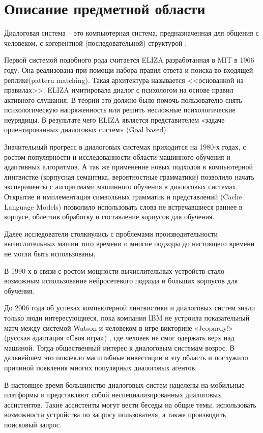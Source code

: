 \chapter{Описание предметной области}
Диалоговая система – это компьютерная система, предназначенная для общения с человеком, с когерентной (последовательной) структурой \cite{jurafsky2017dialog}.

Первой системой подобного рода считается ELIZA разработанная в MIT в 1966 году. Она реализована при помощи набора правил ответа и поиска во входящей реплике(pattern matching). Такая архитектура называется  <<основанной на правилах>>. ELIZA имитировала диалог с психологом на основе правил активного слушания. В теории это должно было помочь пользователю снять психологическую напряженность или решить несложные психологические неурядицы.  В результате чего ELIZA является представителем «задаче ориентированных диалоговых систем» (Goal based). 

Значительный прогресс в диалоговых системах приходится на 1980-х годах, с ростом популярности и исследованности области машинного обучения и адаптивных алгоритмов. А так же применение новых подходов в компьютерной лингвистке (корпусная семантика, вероятностные грамматики)  позволило начать эксперименты с  алгоритмами машинного обучения в диалоговых системах. Открытие и имплементация символьных грамматик и представлений (Cache Language Models) \cite{li2018recurrent} позволило использовать слова не встречавшиеся раннее в корпусе, облегчив обработку и составление корпусов для обучения. 

Далее исследователи столкнулись с проблемами производительности вычислительных машин того времени и многие подходы до настоящего времени не могли быть использованы. 

В 1990-х в связи с ростом мощности вычислительных устройств стало возможным использование нейросетевого подхода и больших корпусов для обучения. 

До 2006 года об успехах компьютерной лингвистики и диалоговых систем знали только люди интересующиеся, пока компания IBM не устроила показательный матч между системой Watson и человеком в игре-викторине «Jeopardy!» (русская адаптация «Своя игра») , где человек не смог одержать верх над машиной. Тогда общественный интерес к диалоговым системам возрос. В дальнейшем это повлекло масштабные инвестиции в эту область и послужило причиной появления многих  популярных диалоговых агентов. 

В настоящее время большинство диалоговых систем нацелены на мобильные платформы и представляют собой неспециализированных диалоговых ассистентов. Такие ассистенты могут вести беседы на общие темы, использовать возможности устройства по запросу пользователя, а также производить поисковый запрос. 

